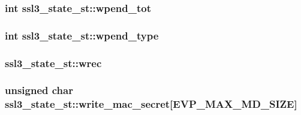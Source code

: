 \subsubsection[{\texorpdfstring{wpend\+\_\+tot}{wpend_tot}}]{\setlength{\rightskip}{0pt plus 5cm}int ssl3\+\_\+state\+\_\+st\+::wpend\+\_\+tot}\hypertarget{structssl3__state__st_ab5e408a79cde9fbe60437e28f6294dc5}{}\label{structssl3__state__st_ab5e408a79cde9fbe60437e28f6294dc5}
\subsubsection[{\texorpdfstring{wpend\+\_\+type}{wpend_type}}]{\setlength{\rightskip}{0pt plus 5cm}int ssl3\+\_\+state\+\_\+st\+::wpend\+\_\+type}\hypertarget{structssl3__state__st_a9433855d8d8f5ee9e388e8ab942b6306}{}\label{structssl3__state__st_a9433855d8d8f5ee9e388e8ab942b6306}
\subsubsection[{\texorpdfstring{wrec}{wrec}}]{ ssl3\+\_\+state\+\_\+st\+::wrec}\hypertarget{structssl3__state__st_ab3e2700e58172be629db1f2af7ef510a}{}\label{structssl3__state__st_ab3e2700e58172be629db1f2af7ef510a}
\subsubsection[{\texorpdfstring{write\+\_\+mac\+\_\+secret}{write_mac_secret}}]{\setlength{\rightskip}{0pt plus 5cm}unsigned char ssl3\+\_\+state\+\_\+st\+::write\+\_\+mac\+\_\+secret\mbox{[}{\bf E\+V\+P\+\_\+\+M\+A\+X\+\_\+\+M\+D\+\_\+\+S\+I\+ZE}\mbox{]}}\hypertarget{structssl3__state__st_a2b686268d62c7756883eea3d9f77926a}{}\label{structssl3__state__st_a2b686268d62c7756883eea3d9f77926a}
